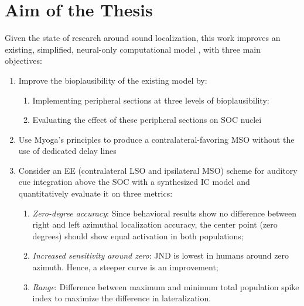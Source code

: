 \documentclass[11pt,a4paper]{article}
\begin{document}
\section{Aim of the Thesis}
Given the state of research around sound localization, this work improves an existing, simplified, neural-only computational model \cite{santisComputationalModelMammalian}, with three main objectives:
\begin{enumerate}
    \item\label{obj:bioplaus} Improve the bioplausibility of the existing model by:
    \begin{enumerate}
        \item Implementing peripheral sections at three levels of bioplausibility:
        \item Evaluating the effect of these peripheral sections on SOC nuclei
    \end{enumerate}
    \item\label{obj:mso} Use Myoga's principles to produce a contralateral-favoring MSO without the use of dedicated delay lines
    \item\label{obj:icc} Consider an EE (contralateral LSO and ipsilateral MSO) scheme for auditory cue integration above the SOC with a synthesized IC model and quantitatively evaluate it on three metrics:
    \begin{enumerate}
        \item \textit{Zero-degree accuracy}: Since behavioral results show no difference between right and left azimuthal localization accuracy, the center point (zero degrees) should show equal activation in both populations;
        \item \textit{Increased sensitivity around zero}: JND is lowest in humans around zero azimuth. Hence, a steeper curve is an improvement;
        \item \textit{Range}: Difference between maximum and minimum total population spike index to maximize the difference in lateralization.
    \end{enumerate}
\end{enumerate}
\end{document}
